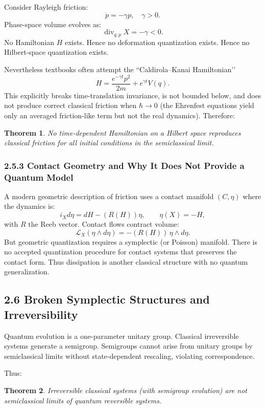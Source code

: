 \documentclass[12pt,oneside]{book}
\theoremstyle{plain}
\newtheorem{theorem}{Theorem}[chapter]
\theoremstyle{definition}
\begin{document}
Consider Rayleigh friction:
\[
\dot{p} = -\gamma p, \quad \gamma>0.
\]
Phase-space volume evolves as:
\[
\operatorname{div}_{q,p} X = -\gamma < 0.
\]
No Hamiltonian $H$ exists.  
Hence no deformation quantization exists.  
Hence no Hilbert-space quantization exists.

Nevertheless textbooks often attempt the “Caldirola–Kanai Hamiltonian’’ 
\[
H = \frac{e^{-\gamma t} p^2}{2m} + e^{\gamma t} V(q).
\]
This explicitly breaks time-translation invariance, is not bounded below, and does not produce correct classical friction when $\hbar \to 0$ (the Ehrenfest equations yield only an averaged friction-like term but not the real dynamics).  
Therefore:

\begin{theorem}
No time-dependent Hamiltonian on a Hilbert space reproduces classical friction for all initial conditions in the semiclassical limit.
\end{theorem}

\subsubsection*{2.5.3 Contact Geometry and Why It Does Not Provide a Quantum Model}

A modern geometric description of friction uses a contact manifold $(C,\eta)$ where the dynamics is:
\[
i_X d\eta = dH - (R(H))\eta, \qquad \eta(X) = -H,
\]
with $R$ the Reeb vector.  
Contact flows contract volume:
\[
\mathcal{L}_X(\eta\wedge d\eta) = - (R(H)) \, \eta\wedge d\eta.
\]
But geometric quantization requires a symplectic (or Poisson) manifold.  
There is no accepted quantization procedure for contact systems that preserves the contact form.  
Thus dissipation is another classical structure with no quantum generalization.

\subsection{2.6 Broken Symplectic Structures and Irreversibility}

Quantum evolution is a one-parameter unitary group.  
Classical irreversible systems generate a semigroup.  
Semigroups cannot arise from unitary groups by semiclassical limits without state-dependent rescaling, violating correspondence.

Thus:

\begin{theorem}
Irreversible classical systems (with semigroup evolution) are not semiclassical limits of quantum reversible systems.
\end{theorem}
\end{document}

